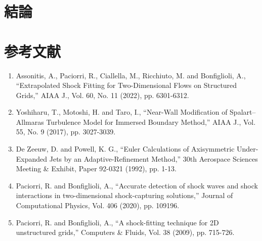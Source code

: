 \documentclass[a4j]{jarticle}
\begin{document}
\section{結論}

\section*{参考文献}

\begin{enumerate}
    \item Assonitis, A., Paciorri, R., Ciallella, M., Ricchiuto, M. and Bonfiglioli, A., ``Extrapolated Shock Fitting for Two-Dimensional Flows on Structured Grids,''
     AIAA J., Vol. 60, No. 11 (2022), pp. 6301-6312.
\label{ref:SF}
    \item Yoshiharu, T., Motoshi, H. and Taro, I., ``Near-Wall Modification of Spalart–Allmaras Turbulence Model for Immersed Boundary Method,''
     AIAA J., Vol. 55, No. 9 (2017), pp. 3027-3039.
\label{ref:IBM}
    \item De Zeeuw, D. and Powell, K. G., ``Euler Calculations of Axisymmetric Under-Expanded Jets by an Adaptive-Refinement Method,''
     30th Aerospace Sciences Meeting \& Exhibit, Paper 92-0321 (1992), pp. 1-13. 
\label{ref:AMR}
    \item Paciorri, R. and Bonfiglioli, A., ``Accurate detection of shock waves and shock interactions in two-dimensional shock-capturing solutions,''
     Journal of Computational Physics, Vol. 406 (2020), pp. 109196.
\label{ref:intera}
     \item Paciorri, R. and Bonfiglioli, A., ``A shock-fitting technique for 2D unstructured grids,''
      Computers \& Fluids, Vol. 38 (2009), pp. 715-726.
\label{ref:effdomain}
    \end{enumerate}
\end{document}
